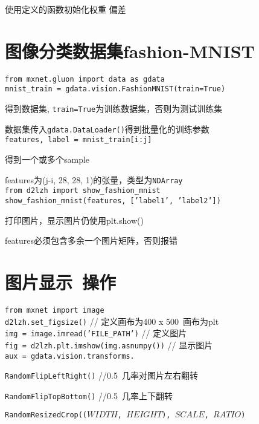 \documentclass[UTF8]{ctexart}
\begin{document}
  使用定义的函数初始化权重 偏差

\section{图像分类数据集fashion-MNIST}
\noindent \texttt{from mxnet.gluon import data as gdata}\\
\texttt{mnist\_train = gdata.vision.FashionMNIST(train=True)} 

  得到数据集, \texttt{train=True}为训练数据集，否则为测试训练集
  
  数据集传入\texttt{gdata.DataLoader()}得到批量化的训练参数\\
\texttt{features, label = mnist\_train[i:j]}
  
  得到一个或多个sample
  
  features为(j-i, 28, 28, 1)的张量，类型为\texttt{NDArray}\\
\texttt{from d2lzh import show\_fashion\_mnist}\\
\texttt{show\_fashion\_mnist(features, ['label1', 'label2'])}

  打印图片，显示图片仍使用plt.show()

  features必须包含多余一个图片矩阵，否则报错

\section{图片显示\ 操作}
\noindent \texttt{from mxnet import image}\\
\texttt{d2lzh.set\_figsize()} // 定义画布为400 x 500\ 画布为plt\\
\texttt{img = image.imread('FILE\_PATH')} // 定义图片\\
\texttt{fig = d2lzh.plt.imshow(img.asnumpy())} // 显示图片\\
\texttt{aux = gdata.vision.transforms.}

  \texttt{RandomFlipLeftRight()} //0.5\ 几率对图片左右翻转

  \texttt{RandomFlipTopBottom()} //0.5\ 几率上下翻转

  \texttt{RandomResizedCrop(($WIDTH$, $HEIGHT$), $SCALE$, $RATIO$)}
\end{document}
